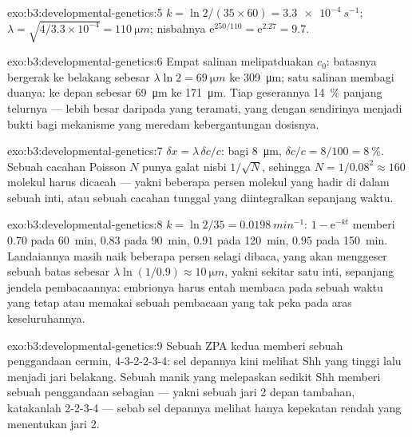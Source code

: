 \begin{solution}{exo:b3:developmental-genetics:5}
$k = \ln 2/(35\times 60) = \qty{3.3e-4}{s^{-1}}$; $\lambda = \sqrt{4/
3.3\times 10^{-4}} = \qty{110}{\micro m}$; nisbahnya $\mathrm{e}^{250/110}
= \mathrm{e}^{2.27} = 9.7$.
\end{solution}

\begin{solution}{exo:b3:developmental-genetics:6}
Empat salinan melipatduakan $c_{0}$: batasnya bergerak ke belakang sebesar $\lambda\ln 2 =
\qty{69}{\micro m}$ ke \qty{309}{\micro m}; satu salinan membagi duanya: ke depan
sebesar \qty{69}{\micro m} ke \qty{171}{\micro m}. Tiap geserannya
\qty{14}{\%} panjang telurnya --- lebih besar daripada yang teramati, yang dengan sendirinya menjadi
bukti bagi mekanisme yang meredam kebergantungan dosisnya.
\end{solution}

\begin{solution}{exo:b3:developmental-genetics:7}
$\delta x = \lambda\,\delta c/c$: bagi \qty{8}{\micro m}, $\delta c/c =
8/100 = \qty{8}{\%}$. Sebuah cacahan Poisson $N$ punya galat nisbi
$1/\sqrt{N}$, sehingga $N = 1/0.08^{2} \approx 160$ molekul harus dicacah
--- yakni beberapa persen molekul yang hadir di dalam sebuah inti, atau sebuah cacahan
tunggal yang diintegralkan sepanjang waktu.
\end{solution}

\begin{solution}{exo:b3:developmental-genetics:8}
$k = \ln 2/35 = \qty{0.0198}{min^{-1}}$: $1 - \mathrm{e}^{-kt}$ memberi
$0.70$ pada \qty{60}{min}, $0.83$ pada \qty{90}{min}, $0.91$ pada
\qty{120}{min}, $0.95$ pada \qty{150}{min}. Landaiannya masih naik
beberapa persen selagi dibaca, yang akan menggeser sebuah batas sebesar
$\lambda\ln(1/0.9) \approx \qty{10}{\micro m}$, yakni sekitar satu inti, sepanjang
jendela pembacaannya: embrionya harus entah membaca pada sebuah waktu yang tetap atau memakai
sebuah pembacaan yang tak peka pada aras keseluruhannya.
\end{solution}

\begin{solution}{exo:b3:developmental-genetics:9}
Sebuah ZPA kedua memberi sebuah penggandaan cermin, 4-3-2-2-3-4: sel
depannya kini melihat Shh yang tinggi lalu menjadi jari belakang. Sebuah manik
yang melepaskan sedikit Shh memberi sebuah penggandaan sebagian --- yakni sebuah jari 2 depan
tambahan, katakanlah 2-2-3-4 --- sebab sel depannya melihat hanya kepekatan
rendah yang menentukan jari 2.
\end{solution}

